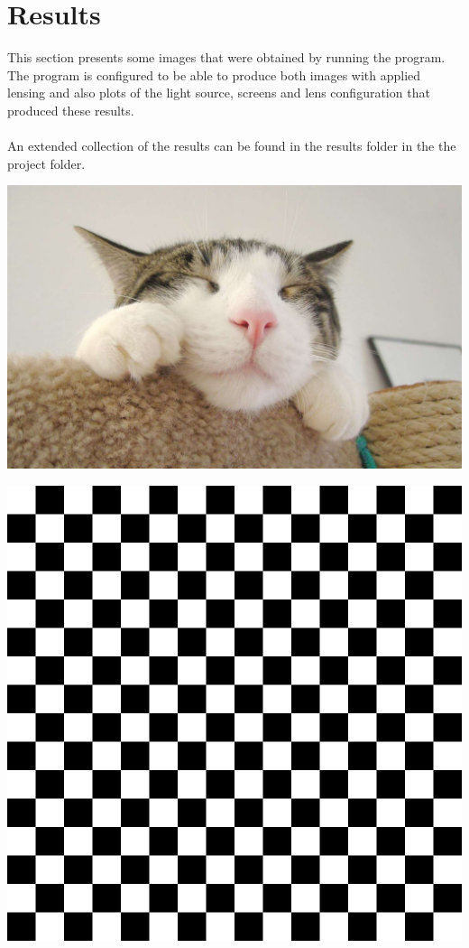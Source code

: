\documentclass[A4]{article}
\begin{document}
\vspace{10mm}

\section{Results}

This section presents some images that were obtained by running the program. The program is configured to be able to produce both images with applied lensing and also plots of the light source, screens and lens configuration that produced these results.\\\\
An extended collection of the results can be found in the results folder in the the project folder.


\vspace{10mm}

\includegraphics[scale=0.3]{cat}

\vspace{10mm}

\includegraphics[scale=0.5]{checkers}
\end{document}
